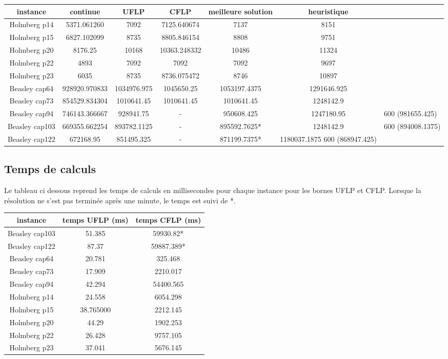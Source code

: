 \begin{tabular}{|c|c|c|c|c|c|}
    \hline
    instance & continue & UFLP & CFLP & meilleure solution & heuristique \\
    \hline
    Holmberg p14 & 5371.061260 & 7092 & 7125.640674 & 7137 & 8151 \\
    Holmberg p15 & 6827.102099 & 8735 & 8805.846154 & 8808 & 9751 \\
    Holmberg p20 & 8176.25 & 10168 & 10363.248332 & 10486 & 11324 \\
    Holmberg p22 & 4893 & 7092 & 7092 & 7092 & 9697 \\
    Holmberg p23 & 6035 & 8735 & 8736.075472 & 8746 & 10897 \\
    Beasley cap64 & 928920.970833 & 1034976.975 & 1045650.25 & 1053197.4375 & 1291646.925 \\
    Beasley cap73 & 854529.834304 & 1010641.45 & 1010641.45 & 1010641.45 & 1248142.9 \\
    Beasley cap94 & 746143.366667 & 928941.75 & - & 950608.425 & 1247180.95 & 600 (981655.425) \\
    Beasley cap103 & 669355.662254 & 893782.1125 & - & 895592.7625* & 1248142.9 & 600 (894008.1375) \\
    Beasley cap122 & 672168.95 & 851495.325 & - & 871199.7375* & 1180037.1875 600 (868947.425) \\
    \hline
\end{tabular}

\newpage

\subsection{Temps de calculs}

Le tableau ci dessous reprend les temps de calculs en millisecondes pour chaque instance pour les bornes UFLP et CFLP.
Lorsque la résolution ne s'est pas terminée après une minute, le temps est suivi de *. \newline

\begin{tabular}{|c|c|c|}
    \hline
    instance & temps UFLP (ms) & temps CFLP (ms) \\
    \hline
    Beasley cap103 & 51.385 & 59930.82* \\
    Beasley cap122 & 87.37 & 59887.389* \\
    Beasley cap64 & 20.781 & 325.468 \\
    Beasley cap73 & 17.909 & 2210.017 \\
    Beasley cap94 & 42.294 & 54400.565 \\
    Holmberg p14 & 24.558 & 6054.298 \\
    Holmberg p15 & 38.765000 & 2212.145 \\
    Holmberg p20 & 44.29 & 1902.253 \\
    Holmberg p22 & 26.428 & 9757.105 \\
    Holmberg p23 &  37.041 & 5676.145 \\
    \hline
\end{tabular}

